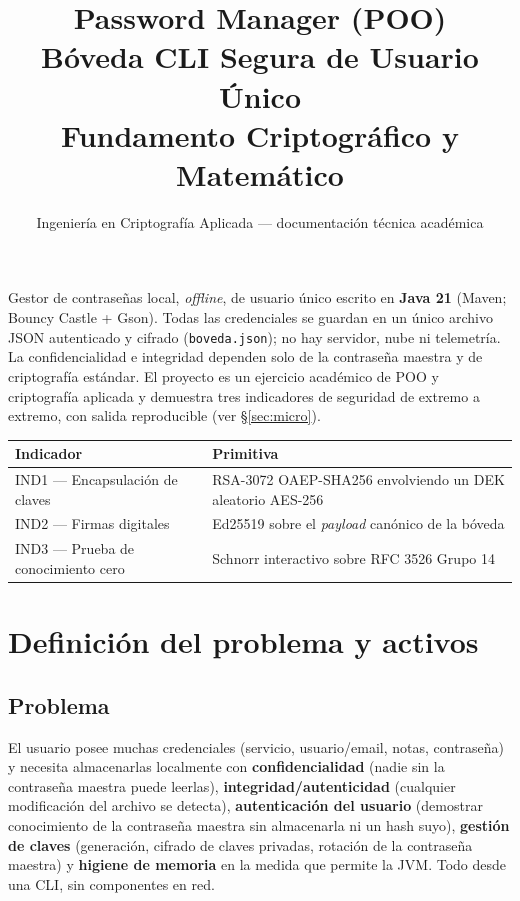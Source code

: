 \documentclass[11pt,a4paper]{article}
\title{Password Manager (POO)\\[0.3em]\large Bóveda CLI Segura de Usuario Único\\Fundamento Criptográfico y Matemático}
\author{Ingeniería en Criptografía Aplicada --- documentación técnica académica}
\date{}
\begin{document}
\maketitle
\tableofcontents
\bigskip

\noindent
Gestor de contraseñas local, \emph{offline}, de usuario único escrito en
\textbf{Java 21} (Maven; Bouncy Castle + Gson). Todas las credenciales se guardan
en un único archivo JSON autenticado y cifrado (\texttt{boveda.json}); no hay
servidor, nube ni telemetría. La confidencialidad e integridad dependen solo de la
contraseña maestra y de criptografía estándar. El proyecto es un ejercicio
académico de POO y criptografía aplicada y demuestra tres indicadores de seguridad
de extremo a extremo, con salida reproducible (ver §\ref{sec:micro}).

\begin{center}
\begin{tabular}{@{}ll@{}}
\toprule
Indicador & Primitiva \\
\midrule
IND1 --- Encapsulación de claves & RSA-3072 OAEP-SHA256 envolviendo un DEK aleatorio AES-256 \\
IND2 --- Firmas digitales        & Ed25519 sobre el \emph{payload} canónico de la bóveda \\
IND3 --- Prueba de conocimiento cero & Schnorr interactivo sobre RFC 3526 Grupo 14 \\
\bottomrule
\end{tabular}
\end{center}

\section{Definición del problema y activos}

\subsection{Problema}
El usuario posee muchas credenciales (servicio, usuario/email, notas, contraseña)
y necesita almacenarlas localmente con \textbf{confidencialidad} (nadie sin la
contraseña maestra puede leerlas), \textbf{integridad/autenticidad} (cualquier
modificación del archivo se detecta), \textbf{autenticación del usuario}
(demostrar conocimiento de la contraseña maestra sin almacenarla ni un hash
suyo), \textbf{gestión de claves} (generación, cifrado de claves privadas,
rotación de la contraseña maestra) y \textbf{higiene de memoria} en la medida que
permite la JVM. Todo desde una CLI, sin componentes en red.
\end{document}
